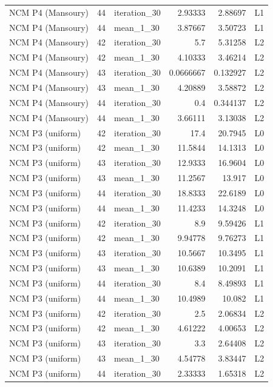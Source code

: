 \begin{table}[htbp!]
\begin{tabular}{lrlrrl}
NCM P4 (Mansoury) & 44 & iteration\_30 & 2.93333 & 2.88697 & L1 \\
NCM P4 (Mansoury) & 44 & mean\_1\_30 & 3.87667 & 3.50723 & L1 \\
NCM P4 (Mansoury) & 42 & iteration\_30 & 5.7 & 5.31258 & L2 \\
NCM P4 (Mansoury) & 42 & mean\_1\_30 & 4.10333 & 3.46214 & L2 \\
NCM P4 (Mansoury) & 43 & iteration\_30 & 0.0666667 & 0.132927 & L2 \\
NCM P4 (Mansoury) & 43 & mean\_1\_30 & 4.20889 & 3.58872 & L2 \\
NCM P4 (Mansoury) & 44 & iteration\_30 & 0.4 & 0.344137 & L2 \\
NCM P4 (Mansoury) & 44 & mean\_1\_30 & 3.66111 & 3.13038 & L2 \\
NCM P3 (uniform) & 42 & iteration\_30 & 17.4 & 20.7945 & L0 \\
NCM P3 (uniform) & 42 & mean\_1\_30 & 11.5844 & 14.1313 & L0 \\
NCM P3 (uniform) & 43 & iteration\_30 & 12.9333 & 16.9604 & L0 \\
NCM P3 (uniform) & 43 & mean\_1\_30 & 11.2567 & 13.917 & L0 \\
NCM P3 (uniform) & 44 & iteration\_30 & 18.8333 & 22.6189 & L0 \\
NCM P3 (uniform) & 44 & mean\_1\_30 & 11.4233 & 14.3248 & L0 \\
NCM P3 (uniform) & 42 & iteration\_30 & 8.9 & 9.59426 & L1 \\
NCM P3 (uniform) & 42 & mean\_1\_30 & 9.94778 & 9.76273 & L1 \\
NCM P3 (uniform) & 43 & iteration\_30 & 10.5667 & 10.3495 & L1 \\
NCM P3 (uniform) & 43 & mean\_1\_30 & 10.6389 & 10.2091 & L1 \\
NCM P3 (uniform) & 44 & iteration\_30 & 8.4 & 8.49893 & L1 \\
NCM P3 (uniform) & 44 & mean\_1\_30 & 10.4989 & 10.082 & L1 \\
NCM P3 (uniform) & 42 & iteration\_30 & 2.5 & 2.06834 & L2 \\
NCM P3 (uniform) & 42 & mean\_1\_30 & 4.61222 & 4.00653 & L2 \\
NCM P3 (uniform) & 43 & iteration\_30 & 3.3 & 2.64408 & L2 \\
NCM P3 (uniform) & 43 & mean\_1\_30 & 4.54778 & 3.83447 & L2 \\
NCM P3 (uniform) & 44 & iteration\_30 & 2.33333 & 1.65318 & L2 \\

\end{tabular}
\end{table}
